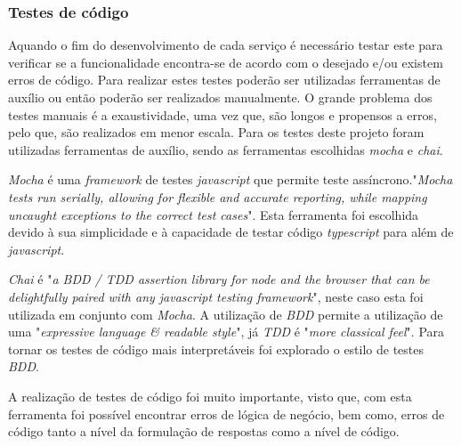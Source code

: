 \subsubsection{Testes de código}
Aquando o fim do desenvolvimento de cada serviço é necessário testar este para verificar se a funcionalidade encontra-se de acordo com o desejado e/ou existem erros de código. Para realizar estes testes poderão ser utilizadas ferramentas de auxílio ou então poderão ser realizados manualmente. O grande problema dos testes manuais é a exaustividade, uma vez que, são longos e propensos a erros, pelo que, são realizados em menor escala. Para os testes deste projeto foram utilizadas ferramentas de auxílio, sendo as ferramentas escolhidas \textit{mocha} e \textit{chai}.

\textit{Mocha} é uma \textit{framework} de testes \textit{javascript} que permite teste assíncrono."\emph{Mocha tests run serially, allowing for flexible and accurate reporting, while mapping uncaught exceptions to the correct test cases}"\citep{mocha}. Esta ferramenta foi escolhida devido à sua simplicidade e à capacidade de testar código \textit{typescript} para além de \textit{javascript}.

\textit{Chai} é "\emph{a BDD / TDD assertion library for node and the browser that can be delightfully paired with any javascript testing framework}"\citep{chai}, neste caso esta foi utilizada em conjunto com \emph{Mocha}. A utilização de \emph{BDD} permite a utilização de uma "\emph{expressive language \& readable style}"\citep{chai}, já \emph{TDD} é "\emph{more classical feel}"\citep{chai}. Para tornar os testes de código mais interpretáveis foi explorado o estilo de testes \emph{BDD}.

A realização de testes de código foi muito importante, visto que, com esta ferramenta foi possível encontrar erros de lógica de negócio, bem como, erros de código tanto a nível da formulação de respostas como a nível de código.



